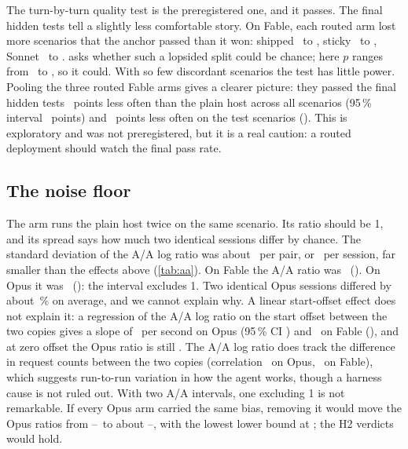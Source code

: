 The turn-by-turn quality test is the preregistered one, and it passes. The final hidden tests tell a
slightly less comfortable story. On Fable, each routed arm lost more scenarios that the anchor passed than
it won: shipped \PassFableShippedAnchorOnly\ to \PassFableShippedArmOnly, sticky
\PassFableStickyAnchorOnly\ to \PassFableStickyArmOnly, Sonnet \PassFableSonnetAnchorOnly\ to
\PassFableSonnetArmOnly.  asks whether such a lopsided split could be chance; here
$p$ ranges from \PassFableMinP\ to \PassFableMaxP, so it could. With so few discordant scenarios the test has
little power. Pooling the three routed Fable arms gives a clearer picture: they passed the final hidden tests
\FinalPoolAll\ points less often than the plain host across all scenarios (95\,\% interval
\FinalPoolAllCI\ points) and \FinalPoolTest\ points less often on the test scenarios (\FinalPoolTestCI).
This is exploratory and was not preregistered, but it is a real caution: a routed deployment should watch the
final pass rate.

\subsection{The noise floor}\label{sec:aa}

The  arm runs the plain host twice on the same scenario. Its ratio should be 1, and its spread
says how much two identical sessions differ by chance. The standard deviation of the A/A log ratio was about
\AAAllSD\ per pair, or \AAAllSDSession\ per session, far smaller than the effects above (\cref{tab:aa}). On
Fable the A/A ratio was \AAFable\ (\AAFableCI). On Opus it was \AAOpus\ (\AAOpusCI): the interval excludes 1. Two identical Opus
sessions differed by about \AAOpusPct\,\% on average, and we cannot explain why. A linear start-offset effect does not explain it: a
regression of the A/A log ratio on the start offset between the two copies gives a slope of
\RvAASlopeOpus\ per second on Opus (95\,\% CI \RvAASlopeOpusCI) and \RvAASlopeFable\ on Fable (\RvAASlopeFableCI),
and at zero offset the Opus ratio is still \RvAAInterceptOpus. The A/A log ratio does track the difference in
request counts between the two copies (correlation \RvAAReqCorrOpus\ on Opus, \RvAAReqCorrFable\ on Fable), which
suggests run-to-run variation in how the agent works, though a harness cause is not ruled out. With two A/A intervals, one
excluding 1 is not remarkable. If every Opus arm carried the same bias, removing it would move the Opus ratios from
\CfOpusStickyPairTwo--\CfOpusSonnetPairTwo\ to about \OpusAdjLow--\OpusAdjHigh, with the lowest lower bound at
\OpusAdjMinLower; the H2 verdicts would hold.

